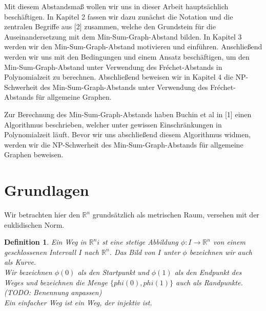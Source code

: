 \documentclass[a4paper, 12pt, twoside]{article}
\theoremstyle{Format1} %
\newtheorem{Def}{Definition}[section]       %
\begin{document}
Mit diesem Abstandsmaß wollen wir uns in dieser Arbeit hauptsächlich beschäftigen.
In Kapitel 2 fassen wir dazu zunächst die Notation und die zentralen Begriffe aus [2] zusammen, welche den Grundstein für die Auseinandersetzung mit dem Min-Sum-Graph-Abstand bilden.
In Kapitel 3 werden wir den Min-Sum-Graph-Abstand motivieren und einführen. Anschließend werden wir uns mit den Bedingungen und einem Ansatz beschäftigen, um den Min-Sum-Graph-Abstand
unter Verwendung des Fréchet-Abstands in Polynomialzeit zu berechnen.
Abschließend beweisen wir in Kapitel 4 die NP-Schwerheit des Min-Sum-Graph-Abstands unter Verwendung des Fréchet-Abstands für allgemeine Graphen.

Zur Berechnung des Min-Sum-Graph-Abstands haben Buchin et al in [1] einen Algorithmus beschrieben, welcher unter gewissen Einschränkungen in Polynomialzeit läuft.
Bevor wir uns abschließend diesem Algorithmus widmen, werden wir die NP-Schwerheit des Min-Sum-Graph-Abstands für allgemeine Graphen beweisen.
\newpage

\section{Grundlagen}
Wir betrachten hier den $ \mathbb{R}^n $ grundsätzlich als metrischen Raum, versehen mit der euklidischen Norm.
\begin{Def}
	Ein \textit{Weg} in $\mathbb{R}^ni$ st eine stetige Abbildung $ \phi: I \to \mathbb{R}^n $ von einem geschlossenen Intervall $I$ nach $\mathbb{R}^n$.
	Das Bild von $I$ unter $\phi$ bezeichnen wir auch als \textit{Kurve}.
	\\
	Wir bezeichnen $\phi(0)$ als den \textit{Startpunkt} und $\phi(1)$ als den \textit{Endpunkt} des Weges und bezeichnen die Menge
	$\{phi(0), phi(1)\}$ auch als Randpunkte. (TODO: Benennung anpassen)
	\\
	Ein \textit{einfacher Weg} ist ein Weg, der injektiv ist.
	\\
\end{Def}
\end{document}
